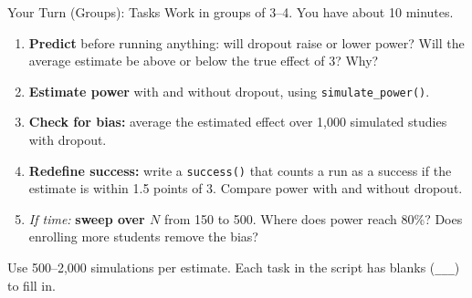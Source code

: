 \documentclass[
  ignorenonframetext,
  aspectratio=169,
]{beamer}
\begin{document}
\begin{frame}{Your Turn (Groups): Tasks}
\label{your-turn-groups-tasks}
\small Work in groups of 3--4. You have about 10 minutes.

\vspace{0.4em}

\begin{enumerate}
\item \textbf{Predict} before running anything: will dropout raise or lower power? Will the average estimate be above or below the true effect of 3? Why?
\item \textbf{Estimate power} with and without dropout, using \texttt{simulate\_power()}.
\item \textbf{Check for bias:} average the estimated effect over 1,000 simulated studies with dropout.
\item \textbf{Redefine success:} write a \texttt{success()} that counts a run as a success if the estimate is within 1.5 points of 3. Compare power with and without dropout.
\item \textit{If time:} \textbf{sweep over $N$} from 150 to 500. Where does power reach 80\%? Does enrolling more students remove the bias?
\end{enumerate}

\vspace{0.4em}

\footnotesize Use 500--2,000 simulations per estimate. Each task in the
script has blanks (\texttt{\_\_\_}) to fill in.
\end{frame}
\end{document}
